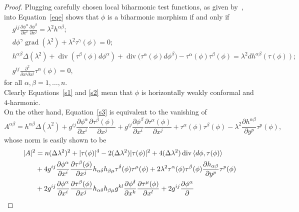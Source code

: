 \documentclass[12pt]{amsart}
\theoremstyle{plain}
\theoremstyle{definition}
\begin{document}
\begin{proof}
Plugging carefully chosen local biharmonic test functions, as given
by~\cite[Proposition~2.4]{A-G}, into Equation~\eqref{eqe} shows that $\phi$ is a
biharmonic morphism if and only if
\begin{align}
& g^{ij} \frac{\partial \phi^{\alpha}}{\partial x^{i}}\frac{\partial
\phi^{\beta}}{\partial x^{j}} = \lambda^{2} h^{\alpha\beta} \label{s1};\\
&d\phi^{\gamma} \operatorname{grad}{\left(\lambda^{2}\right)} + \lambda^{2}
\tau^{\gamma}(\phi)  = 0 \label{s2};\\
&h^{\alpha\beta}\Delta(\lambda^{2}) + 
\operatorname{div}{ (\tau^{\beta}(\phi)d\phi^{\alpha})} +
\operatorname{div}{ (\tau^{\alpha}(\phi)d\phi^{\beta}}) -
\tau^{\alpha}(\phi)\tau^{\beta}(\phi) =\lambda^{2} dh^{\alpha\beta}(\tau(\phi)) \label{s3};\\
&g^{ij} \frac{\partial^{2} }{\partial x^{i} \partial x^{j}} \tau^{\alpha}(\phi) = 0,
\label{s4}
\end{align}
for all $\alpha, \beta = 1,\dots, n$.\\
Clearly Equations~\eqref{s1} and \eqref{s2} mean that $\phi$ is horizontally weakly conformal and $4$-harmonic.\\
On the other hand, Equation~\eqref{s3} is equivalent to the vanishing of
$$A^{\alpha\beta} = h^{\alpha\beta}\Delta(\lambda^{2}) +
g^{ij}\frac{\partial \phi^{\alpha}}{\partial x^{i}} \frac{\partial
\tau^{\beta}(\phi)}{\partial x^{j}} + g^{ij}\frac{\partial \phi^{\beta}}{\partial
x^{i}} \frac{\partial \tau^{\alpha}(\phi)}{\partial x^{j}}
+\tau^{\alpha}(\phi)\tau^{\beta}(\phi) - \lambda^{2} \frac{\partial
h^{\alpha\beta}}{\partial y^{p}} \tau^{p}(\phi),$$ whose norm is easily shown to be
\begin{align*}
|A|^{2} &=  n (\Delta \lambda^{2})^{2} + |\tau(\phi)|^{4} -
2(\Delta\lambda^{2})|\tau(\phi)|^{2} + 4 (\Delta\lambda^{2})
\operatorname{div}{\langle d\phi , \tau(\phi)\rangle} \label{eq10}\\
& + 4 g^{ij} \frac{\partial \phi^{\alpha}}{\partial x^{i}} \frac{\partial
\tau^{\beta}(\phi)}{\partial x^{j}} h_{\alpha\delta}h_{\beta\mu}
\tau^{\delta}(\phi)\tau^{\mu}(\phi)
  + 2 \lambda^{2} \tau^{\alpha}(\phi)\tau^{\beta}(\phi)
\frac{\partial h_{\alpha\beta}}{\partial y^{p}} \tau^{p}(\phi) \notag\\
& + 2 g^{ij} \frac{\partial \phi^{\alpha}}{\partial x^{i}} \frac{\partial
\tau^{\beta}(\phi)}{\partial x^{j}} h_{\alpha\delta}h_{\beta\mu} g^{kl}
\frac{\partial \phi^{\delta}}{\partial x^{k}} \frac{\partial
\tau^{\mu}(\phi)}{\partial x^{l}} +  2 g^{ij} \frac{\partial \phi^{\alpha}}{\partial
}
\end{align*}
\end{proof}
\end{document}
